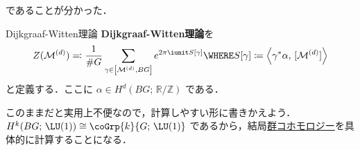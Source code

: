 \documentclass[TQFT_main]{subfiles}
\begin{document}
であることが分かった．

\begin{mydef}[label=def:Dijkgraaf-Witten]{Dijkgraaf-Witten理論}
    \textbf{Dijkgraaf-Witten理論}を
    \begin{align}
        \label{eq:DW-partition-func}
        Z(\mfdcal{M}{d}) \eqqcolon \frac{1}{\# G} \sum_{\gamma \in \comm{\mfdcal{M}{d}}{BG}} e^{2\pi \iunit S[\gamma]} \WHERE S[\gamma] \coloneqq \expval{\gamma^* \alpha,\, [\mfdcal{M}{d}]}
    \end{align}
    と定義する．ここに $\alpha \in H^d(BG;\, \mathbb{R}/\mathbb{Z})$ である．
\end{mydef}


このままだと実用上不便なので，計算しやすい形に書きかえよう．$H^k(BG;\, \LU (1)) \cong \coGrp{k}{G;\, \LU(1)}$ であるから，結局\hyperref[def:group-cohomology]{群コホモロジー}を具体的に計算することになる．
\end{document}
